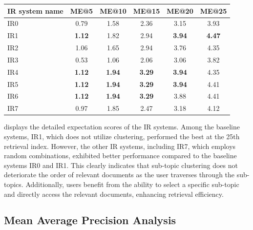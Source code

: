 \begin{center}
	\label{tab:mae_results}
	\begin{tabularx}{0.8\textwidth}{|Y|c|c|c|c|c|}
		\hline
		IR system name & ME@5 & ME@10 & ME@15 & ME@20 & ME@25 \\
\hline
IR0 &          0.79 &           1.58 &           2.36 &           3.15 &           3.93 \\ \hline 
IR1 &          \textbf{1.12} &           1.82 &           2.94 &          \textbf{3.94} &           \textbf{4.47} \\ \hline
IR2 &          1.06 &           1.65 &           2.94 &           3.76 &           4.35 \\ \hline
IR3 &          0.53 &           1.06 &           2.06 &           3.06 &           3.82 \\ \hline
IR4 &           \textbf{1.12}  &            \textbf{1.94}  &          \textbf{3.29} &           \textbf{3.94} &           4.35 \\ \hline
IR5 &           \textbf{1.12}  &           \textbf{1.94} &           \textbf{3.29} &       \textbf{3.94}&           4.41 \\ \hline
IR6 &          \textbf{1.12}  &           \textbf{1.94} &           \textbf{3.29} &           3.88 &           4.41 \\ \hline
IR7 &          0.97 &           1.85 &           2.47 &           3.18 &           4.12 \\ \hline
	\end{tabularx}
\end{center}

 displays the detailed expectation scores of the IR systems. Among the baseline systems, IR1, which does not utilize clustering, performed the best at the 25th retrieval index. However, the other IR systems, including IR7, which employs random combinations, exhibited better performance compared to the baseline systems IR0 and IR1. This clearly indicates that sub-topic clustering does not deteriorate the order of relevant documents as the user traverses through the sub-topics. Additionally, users benefit from the ability to select a specific sub-topic and directly access the relevant documents, enhancing retrieval efficiency.

\subsection{Mean Average Precision Analysis}

